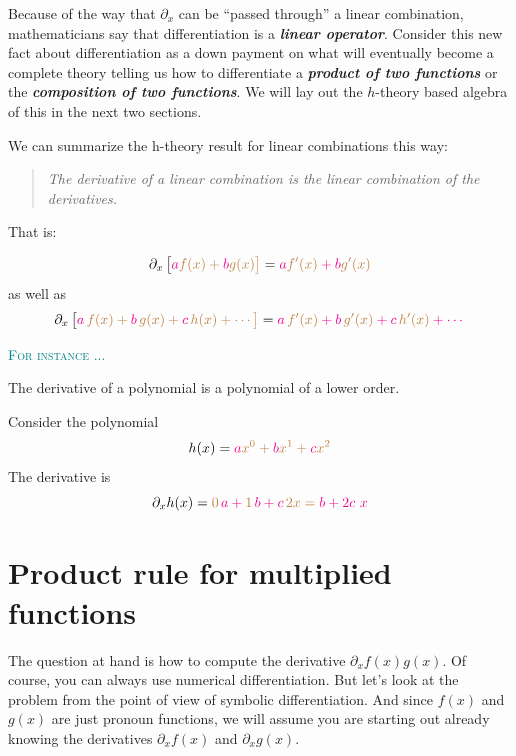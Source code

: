 \documentclass[
  letterpaper,
  DIV=11,
  numbers=noendperiod,
  oneside]{scrreprt}
\newenvironment{example}%
{%
\textcolor{teal}{\hrulefill}%
  \par\vspace{.3\baselineskip}%
  \textcolor{teal}{\scshape For instance ...}%
  \par\vspace{\baselineskip}%
}%
{\textcolor{teal}{\hrulefill}}
\begin{document}
Because of the way that \(\partial_x\) can be ``passed through'' a
linear combination, mathematicians say that differentiation is a
\textbf{\emph{linear operator}}. Consider this new fact about
differentiation as a down payment on what will eventually become a
complete theory telling us how to differentiate a \textbf{\emph{product
of two functions}} or the \textbf{\emph{composition of two functions}}.
We will lay out the \(h\)-theory based algebra of this in the next two
sections.

We can summarize the h-theory result for linear combinations this way:

\begin{quote}
\emph{The derivative of a linear combination is the linear combination
of the derivatives.}
\end{quote}

That is:

\[\partial_x \left[\strut \color{magenta}{a} \color{brown}{f(x)} + \color{magenta}{b} \color{brown}{g(x)}\right] = \color{magenta}{a} {\large\color{brown}{f'(x)}} + \color{magenta}{b} {\large\color{brown}{g'(x)}}\]
as well as
\[\partial_x \left[\strut \color{magenta}{a}\, \color{brown}{f(x)} + \color{magenta}{b}\, \color{brown}{g(x)}  + \color{magenta}{c}\, \color{brown}{h(x)} + \cdots\right] = \color{magenta}{a}\, {\large\color{brown}{f'(x)}} + \color{magenta}{b}\, {\large\color{brown}{g'(x)}} + \color{magenta}{c}\, {\large\color{brown}{h'(x)}} + \cdots\]

\begin{example}
The derivative of a polynomial is a polynomial of a lower order.

Consider the polynomial
\[h(x) = \color{magenta}{a}\color{brown}{x^0}  + \color{magenta}{b} \color{brown}{x^1} + \color{magenta}{c} \color{brown}{x^2}\]
The derivative is
\[\partial_x h(x) = \color{brown}{0}\, \color{magenta}{a}  + \color{brown}{1}\, \color{magenta}{b}  + \color{magenta}{c}\, \color{brown}{2 x} = \color{magenta}{b} +  \color{magenta}{2 c}\  x\]

\end{example}

\hypertarget{product-rule-for-multiplied-functions}{%
\section{Product rule for multiplied
functions}\label{product-rule-for-multiplied-functions}}

The question at hand is how to compute the derivative
\(\partial_x f(x) g(x)\). Of course, you can always use numerical
differentiation. But let's look at the problem from the point of view of
symbolic differentiation. And since \(f(x)\) and \(g(x)\) are just
pronoun functions, we will assume you are starting out already knowing
the derivatives \(\partial_x f(x)\) and \(\partial_x g(x)\).
\end{document}

